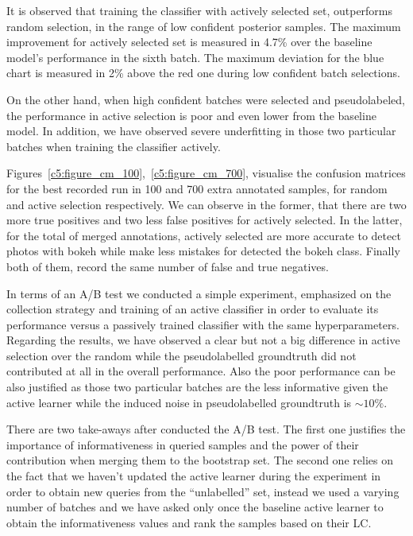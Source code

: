 It is observed that training the classifier with  actively selected set, outperforms random selection, in the range of low confident posterior samples. The maximum improvement for actively selected set is measured in 4.7\% over the baseline model's performance in the sixth batch. The maximum deviation for the blue chart is measured in 2\% above the red one during low confident batch selections.

On the other hand, when high confident batches were selected and pseudolabeled, the performance in active selection is poor and even lower from the baseline model. In addition, we have observed severe underfitting in those two particular batches when training the classifier actively.

Figures~\ref{c5:figure_cm_100},~\ref{c5:figure_cm_700}, visualise the confusion matrices for the best recorded run in 100 and 700 extra annotated samples, for random and active selection respectively.
We can observe in the former, that there are two more true positives and two less false positives for actively selected. In the latter, for the total of merged annotations, actively selected are more accurate to detect photos with bokeh while make less mistakes for detected the bokeh class. Finally both of them, record the same number of false and true negatives.

In terms of an A/B test we conducted a simple experiment, emphasized on the collection strategy and training of an active classifier in order to evaluate its performance versus a passively trained classifier with the same hyperparameters. Regarding the results, we have observed a clear but not a big difference in active selection over the random while the pseudolabelled groundtruth did not contributed at all in the overall performance.
Also the poor performance can be also justified as those two particular batches are the less informative given the active learner while the induced noise in pseudolabelled groundtruth is $\sim10\%$.

There are two take-aways after conducted the A/B test. The first one justifies the importance of informativeness in queried samples and the power of their contribution when merging them to the bootstrap set. The second one relies on the fact that we haven't updated the active learner during the experiment in order to obtain new queries from the ``unlabelled'' set, instead we used a varying number of batches and we have asked only once the baseline active learner to obtain the informativeness values and rank the samples based on their LC.

